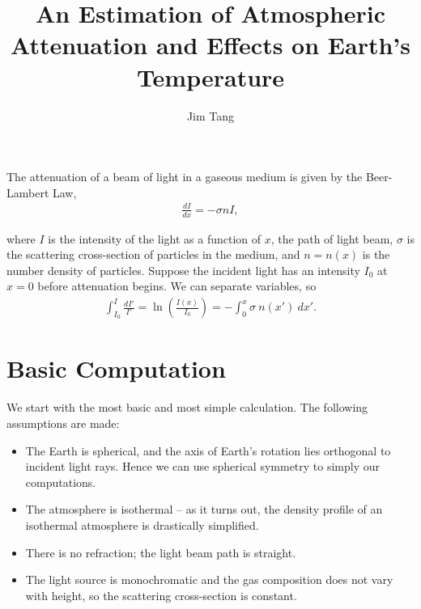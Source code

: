 \documentclass[10pt]{article}
\title{An Estimation of Atmospheric Attenuation and Effects on Earth's Temperature}
\author{Jim Tang}
\begin{document}
  \maketitle


The attenuation of a beam of light in a gaseous medium is given by the Beer-Lambert Law,
\begin{align}
\frac{dI}{dx} = - \sigma n I,
\end{align}

where $I$ is the intensity of the light as a function of $x$, the path of light beam, $\sigma$ is the scattering cross-section of particles in the medium, and $n=n(x)$ is the number density of particles. Suppose the incident light has an intensity $I_0$ at $x=0$ before attenuation begins. We can separate variables, so
\begin{align} \label{eq:ln_i-i0}
\int_{I_0}^I \frac{dI'}{I'} = \ln \left( \frac{I(x)}{I_0} \right) = - \int_0^x \sigma \:n(x') \:dx'.
\end{align}

\section{Basic Computation}
\label{sec:basic}

We start with the most basic and most simple calculation. The following assumptions are made:
\begin{itemize}
\item The Earth is spherical, and the axis of Earth's rotation lies orthogonal to incident light rays. Hence we can use spherical symmetry to simply our computations.
\item The atmosphere is isothermal -- as it turns out, the density profile of an isothermal atmosphere is drastically simplified.
\item There is no refraction; the light beam path is straight.
\item The light source is monochromatic and the gas composition does not vary with height, so the scattering cross-section is constant.
\end{itemize}
\end{document}
